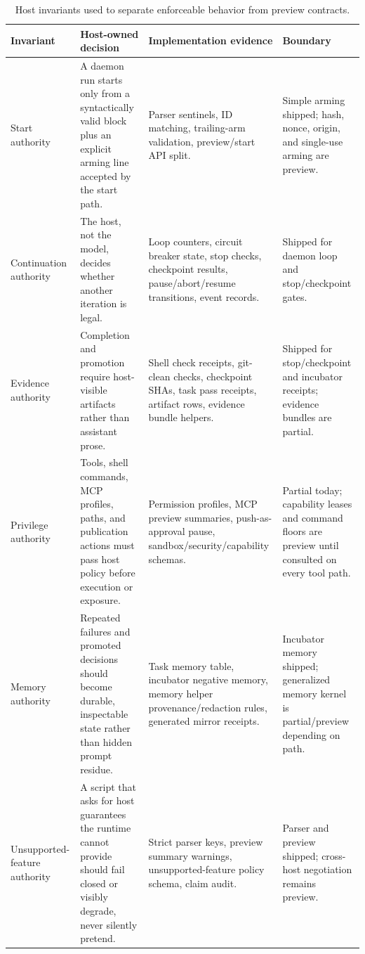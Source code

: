 \documentclass[conference]{IEEEtran}
\begin{document}
\begin{table}[t]
\centering
\caption{Host invariants used to separate enforceable behavior from preview contracts.}
\label{tab:invariants}
\footnotesize
\begin{tabularx}{\textwidth}{p{30mm}p{38mm}p{44mm}X}
\toprule
Invariant & Host-owned decision & Implementation evidence & Boundary \\
\midrule
Start authority & A daemon run starts only from a syntactically valid block plus an explicit arming line accepted by the start path. & Parser sentinels, ID matching, trailing-arm validation, preview/start API split. & Simple arming shipped; hash, nonce, origin, and single-use arming are preview. \\
\midrule
Continuation authority & The host, not the model, decides whether another iteration is legal. & Loop counters, circuit breaker state, stop checks, checkpoint results, pause/abort/resume transitions, event records. & Shipped for daemon loop and stop/checkpoint gates. \\
\midrule
Evidence authority & Completion and promotion require host-visible artifacts rather than assistant prose. & Shell check receipts, git-clean checks, checkpoint SHAs, task pass receipts, artifact rows, evidence bundle helpers. & Shipped for stop/checkpoint and incubator receipts; evidence bundles are partial. \\
\midrule
Privilege authority & Tools, shell commands, MCP profiles, paths, and publication actions must pass host policy before execution or exposure. & Permission profiles, MCP preview summaries, push-as-approval pause, sandbox/security/capability schemas. & Partial today; capability leases and command floors are preview until consulted on every tool path. \\
\midrule
Memory authority & Repeated failures and promoted decisions should become durable, inspectable state rather than hidden prompt residue. & Task memory table, incubator negative memory, memory helper provenance/redaction rules, generated mirror receipts. & Incubator memory shipped; generalized memory kernel is partial/preview depending on path. \\
\midrule
Unsupported-feature authority & A script that asks for host guarantees the runtime cannot provide should fail closed or visibly degrade, never silently pretend. & Strict parser keys, preview summary warnings, unsupported-feature policy schema, claim audit. & Parser and preview shipped; cross-host negotiation remains preview. \\
\bottomrule
\end{tabularx}
\end{table}
\end{document}
